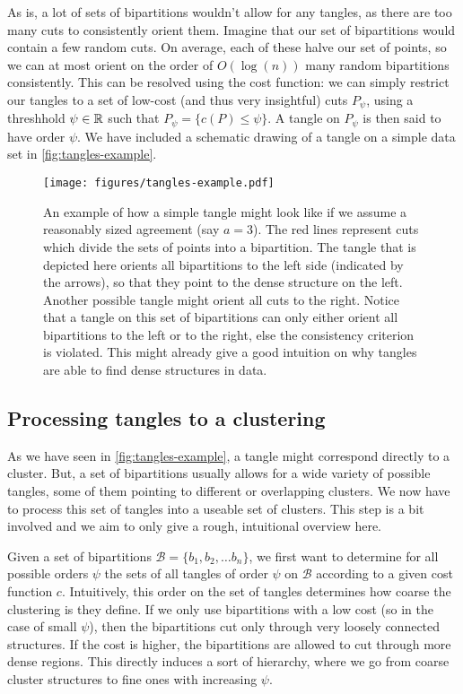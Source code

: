 As is, a lot of sets of bipartitions wouldn't allow for any tangles, as there are too many cuts to consistently orient them. 
Imagine that our set of bipartitions would contain a few random cuts. 
On average, each of these halve our set of points, so we can at most orient on the order of $O(\log(n))$ many random bipartitions consistently.
This can be resolved using the cost function: we can simply restrict our tangles to a set of low-cost (and thus very insightful) cuts $P_{\psi}$, using a threshhold $\psi \in \mathbb{R}$ such that
$P_{\psi} = \{ c(P) \le \psi \}$. A tangle on $P_{\psi}$ is then said to have order $\psi$. We have included a schematic drawing of a tangle on a simple data set in \autoref{fig:tangles-example}.


\begin{figure}[h]
    \centering
    \texttt{[image: figures/tangles-example.pdf]}
    \caption{An example of how a simple tangle might look like if we assume a reasonably sized agreement (say $a = 3$). 
        The red lines represent cuts which divide the sets of points into a bipartition.  
        The tangle that is depicted here orients all bipartitions to the left side (indicated by the arrows), 
        so that they point to the dense structure on the left. 
        Another possible tangle might orient all cuts to the right. Notice that a tangle on this set of bipartitions can only either orient all bipartitions to the left or to the right, else
        the consistency criterion is violated. This might already give a good intuition on why tangles are able to find dense structures in data.}
    \label{fig:tangles-example}
\end{figure}

\subsection{Processing tangles to a clustering}
As we have seen in \autoref{fig:tangles-example}, a tangle might correspond directly to a cluster. But, a set of bipartitions usually allows for a wide 
variety of possible tangles, some of them pointing to different or overlapping clusters. We now have to process this set of tangles into a useable set of clusters.
This step is a bit involved and we aim to only give a rough, intuitional overview here. 

Given a set of bipartitions $\mathcal{B} = \{b_1, b_2, \ldots b_n\} $, we first want to determine for all possible orders $\psi$ the sets of all tangles of order $\psi$ on $\mathcal{B}$ 
according to a given cost function $c$. Intuitively, this order on the set of tangles determines how coarse the clustering is they define.
If we only use bipartitions with a low cost (so in the case of small $\psi$), then the bipartitions cut only through very loosely connected structures. 
If the cost is higher, the bipartitions are allowed to cut through more dense regions. This directly induces a sort of hierarchy, where we go from coarse cluster
structures to fine ones with increasing $\psi$.

